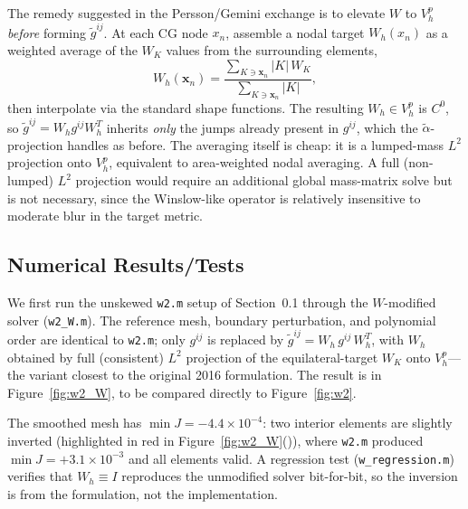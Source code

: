 \documentclass[11pt]{article}
\begin{document}
The remedy suggested in the Persson/Gemini exchange is to elevate
$W$ to $V_h^p$ \emph{before} forming $\tilde g^{ij}$. At each CG
node $x_n$, assemble a nodal target $W_h(x_n)$ as a weighted average
of the $W_K$ values from the surrounding elements,
\begin{equation}
  W_h(\mathbf{x}_n)
    = \frac{\sum_{K \ni \mathbf{x}_n} |K|\, W_K}
           {\sum_{K \ni \mathbf{x}_n} |K|},
  \label{eq:Wnodal}
\end{equation}
then interpolate via the standard shape functions. The resulting
$W_h \in V_h^p$ is $C^0$, so $\tilde g^{ij} = W_h g^{ij} W_h^T$
inherits \emph{only} the jumps already present in $g^{ij}$, which
the $\tilde\alpha$-projection handles as before. The averaging
itself is cheap: it is a lumped-mass $L^2$ projection onto $V_h^p$,
equivalent to area-weighted nodal averaging. A full (non-lumped)
$L^2$ projection would require an additional global mass-matrix
solve but is not necessary, since the Winslow-like operator is
relatively insensitive to moderate blur in the target metric.

\subsection{Numerical Results/Tests}
\label{sec:W-numerical}

We first run the unskewed \texttt{w2.m} setup of Section~0.1 through
the $W$-modified solver (\texttt{w2\_W.m}). The reference mesh,
boundary perturbation, and polynomial order are identical to
\texttt{w2.m}; only $g^{ij}$ is replaced by
$\tilde g^{ij} = W_h\, g^{ij}\, W_h^T$, with $W_h$ obtained by full
(consistent) $L^2$ projection of the equilateral-target $W_K$ onto
$V_h^p$---the variant closest to the original 2016 formulation. The result
is in Figure~\ref{fig:w2_W}, to be compared directly to
Figure~\ref{fig:w2}.

The smoothed mesh has $\min J = -4.4 \times 10^{-4}$: two interior
elements are slightly inverted (highlighted in red in
Figure~\ref{fig:w2_W}()), where \texttt{w2.m}
produced $\min J = +3.1 \times 10^{-3}$ and all elements valid. A
regression test (\texttt{w\_regression.m}) verifies that
$W_h \equiv I$ reproduces the unmodified solver bit-for-bit, so the
inversion is from the formulation, not the implementation.
\end{document}
